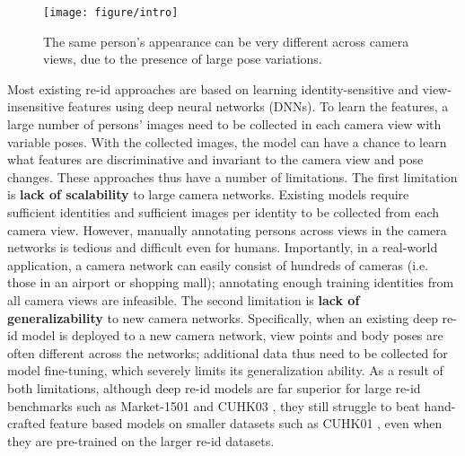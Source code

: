 \documentclass[10pt,letterpaper,twocolumn,10pt,letterpaper,twocolumn]{article}
\begin{document}
\begin{figure}[t]
\begin{centering}
\texttt{[image: figure/intro]} 
\par\end{centering}
\caption{The same person's appearance can be very different across camera views,
due to the presence of large pose variations.}
\label{fig:The-different_pose} 
\end{figure}

Most existing re-id approaches \cite{deepreid,Ejaz_cvpr2015,de_cheng_2016,yu2017cross,qian2017multi,SVDNet,reid_in_wild,PersonSearch}
are based on learning identity-sensitive and view-insensitive features
using deep neural networks (DNNs). To learn the features, a large
number of persons' images need to be collected in each camera view
with variable poses. With the collected images, the model can have a chance to learn what features
are discriminative and invariant to the camera view and pose changes.
These approaches thus have a number of limitations. The first limitation
is \textbf{lack of scalability} to large camera networks. Existing
models require sufficient identities and sufficient images per identity
to be collected from each camera view. However, manually annotating
persons across views in the camera networks is tedious and difficult
even for humans. Importantly, in a real-world application, a camera
network can easily consist of hundreds of cameras (i.e. those in an
airport or shopping mall); annotating enough training identities from
all camera views are infeasible. The second limitation is \textbf{lack
of generalizability} to new camera networks. Specifically, when an
existing deep re-id model is deployed to a new camera network, view
points and body poses are often different across the networks; additional data thus need
to be collected for model fine-tuning, which severely limits its generalization
ability. As a result of both limitations, although deep re-id models
are far superior for large re-id benchmarks such as Market-1501 \cite{market1501}
and CUHK03 \cite{deepreid}, they still struggle to beat hand-crafted
feature based models on smaller datasets such as CUHK01 \cite{cuhk01},
even when they are pre-trained on the larger re-id datasets.
\end{document}
